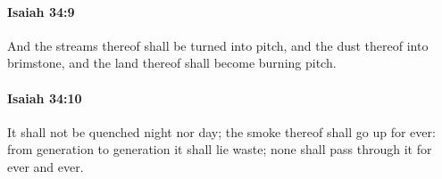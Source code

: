 		\paragraph{Isaiah 34:9} %
			\label{ISAIAH-34-9}

			And the streams thereof shall be turned into pitch, and the dust thereof into brimstone, and the land thereof shall become burning pitch.


		\paragraph{Isaiah 34:10} %
			\label{ISAIAH-34-10}

			It shall not be quenched night nor day; the smoke thereof shall go up for ever: from generation to generation it shall lie waste; none shall pass through it for ever and ever.


